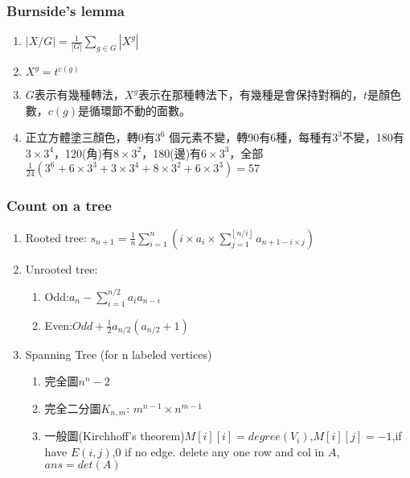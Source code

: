 \subsubsection{Burnside's lemma}
\begin{enumerate}\itemsep = -3pt
	\item $|X/G| = \frac{1}{|G|}\sum_{g \in G}|X^g|$
	\item $X^g=t^{c(g)}$
	\item $G$表示有幾種轉法，$X^g$表示在那種轉法下，有幾種是會保持對稱的，$t$是顏色數，$c(g)$是循環節不動的面數。
	\item 正立方體塗三顏色，轉0有$3^6$ 個元素不變，轉90有6種，每種有$3^3$不變，180有$3\times 3^4$，120(角)有$8\times 3^2$，180(邊)有$6\times 3^3$，全部$\frac{1}{24}\left(3^6+6\times 3^3 + 3 \times 3^4 + 8 \times 3^2 + 6 \times 3^3 \right) = 57$
\end{enumerate}

\subsubsection{Count on a tree}
\begin{enumerate}\itemsep = -3pt
	\item Rooted tree: $s_{n+1}=\frac{1}{n}\sum_{i=1}^{n}(i\times a_i\times \sum_{j=1}^{\left \lfloor  n/i\right \rfloor} a_{n+1-i\times j})$
	\item Unrooted tree: 
	\begin{enumerate}\itemsep = -2pt
		\item Odd:$a_n-\sum_{i=1}^{n/2}a_ia_{n-i}$
		\item Even:$Odd+\frac{1}{2}a_{n/2}(a_{n/2}+1)$
	\end{enumerate}
	\item Spanning Tree (for n labeled vertices)
	\begin{enumerate}\itemsep = -2pt
		\item 完全圖$n^n-2$
		\item 完全二分圖$K_{n,m}$: $m^{n-1} \times n^{m-1}$
		\item 一般圖(Kirchhoff's theorem)$M[i][i]=degree(V_i)$,$M[i][j]=-1$,if have $E(i,j)$,$0$ if no edge. delete any one row and col in $A$, $ans = det(A)$
	\end{enumerate}
\end{enumerate}

